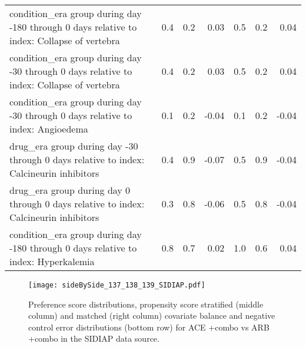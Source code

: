 \documentclass[11pt,]{article}
\begin{document}
\begin{longtable}{p{30em}rrrrrr}
  condition\_era group during day -180 through 0 days relative to index: Collapse of vertebra & 0.4 & 0.2 & 0.03 & 0.5 & 0.2 & 0.04 \\ 
  condition\_era group during day -30 through 0 days relative to index: Collapse of vertebra & 0.4 & 0.2 & 0.03 & 0.5 & 0.2 & 0.04 \\ 
  condition\_era group during day -30 through 0 days relative to index: Angioedema & 0.1 & 0.2 & -0.04 & 0.1 & 0.2 & -0.04 \\ 
  drug\_era group during day -30 through 0 days relative to index: Calcineurin inhibitors & 0.4 & 0.9 & -0.07 & 0.5 & 0.9 & -0.04 \\ 
  drug\_era group during day 0 through 0 days relative to index: Calcineurin inhibitors & 0.3 & 0.8 & -0.06 & 0.5 & 0.8 & -0.04 \\ 
  condition\_era group during day -180 through 0 days relative to index: Hyperkalemia & 0.8 & 0.7 & 0.02 & 1.0 & 0.6 & 0.04 \\ 
  \bottomrule
\end{longtable}
\clearpage\begin{figure}[H]
    \caption{Preference score distributions,
    propensity score stratified (middle column) and matched (right column) covariate balance
    and negative control error distributions (bottom row) for
    ACE +combo vs ARB +combo in the SIDIAP data source.}
    \centerline{
        \texttt{[image: sideBySide\_137\_138\_139\_SIDIAP.pdf]}
    }
\end{figure}
\end{document}
